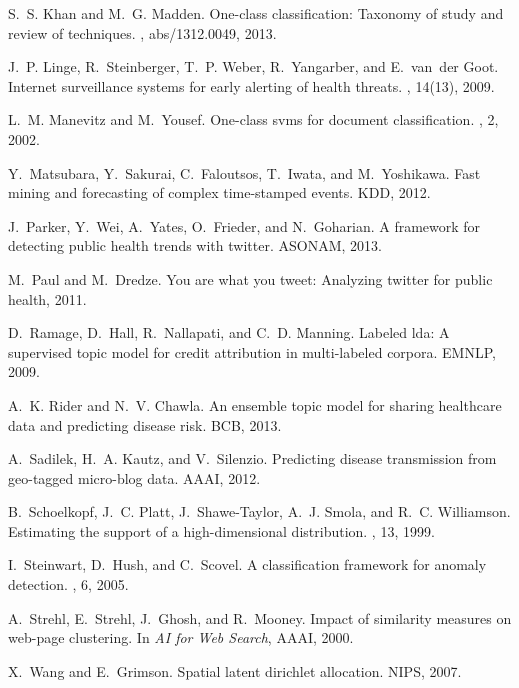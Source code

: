 \documentclass[twoside,leqno,twocolumn]{article}
\begin{document}
\begin{thebibliography}{9}
S.~S. Khan and M.~G. Madden.
\newblock One-class classification: Taxonomy of study and review of techniques.
, abs/1312.0049, 2013.

J.~P. Linge, R.~Steinberger, T.~P. Weber, R.~Yangarber, and E.~van~der Goot.
\newblock Internet surveillance systems for early alerting of health threats.
, 14(13), 2009.

L.~M. Manevitz and M.~Yousef.
\newblock One-class svms for document classification.
, 2, 2002.

Y.~Matsubara, Y.~Sakurai, C.~Faloutsos, T.~Iwata, and M.~Yoshikawa.
\newblock Fast mining and forecasting of complex time-stamped events.
\newblock KDD, 2012.

J.~Parker, Y.~Wei, A.~Yates, O.~Frieder, and N.~Goharian.
\newblock A framework for detecting public health trends with twitter.
\newblock ASONAM, 2013.

M.~Paul and M.~Dredze.
\newblock You are what you tweet: Analyzing twitter for public health, 2011.

D.~Ramage, D.~Hall, R.~Nallapati, and C.~D. Manning.
\newblock Labeled lda: A supervised topic model for credit attribution in
  multi-labeled corpora.
\newblock EMNLP, 2009.

A.~K. Rider and N.~V. Chawla.
\newblock An ensemble topic model for sharing healthcare data and predicting
  disease risk.
\newblock BCB, 2013.

A.~Sadilek, H.~A. Kautz, and V.~Silenzio.
\newblock Predicting disease transmission from geo-tagged micro-blog data.
\newblock AAAI, 2012.

B.~Schoelkopf, J.~C. Platt, J.~Shawe-Taylor, A.~J. Smola, and R.~C. Williamson.
\newblock Estimating the support of a high-dimensional distribution.
, 13, 1999.

I.~Steinwart, D.~Hush, and C.~Scovel.
\newblock A classification framework for anomaly detection.
, 6, 2005.

A.~Strehl, E.~Strehl, J.~Ghosh, and R.~Mooney.
\newblock Impact of similarity measures on web-page clustering.
\newblock In {\em AI for Web Search}, AAAI, 2000.

X.~Wang and E.~Grimson.
\newblock Spatial latent dirichlet allocation.
\newblock NIPS, 2007.


\end{thebibliography}
\end{document}
